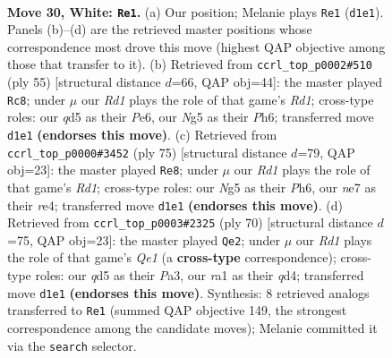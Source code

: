 \documentclass[11pt]{article}
\begin{document}
\clearpage

\begin{figure}[p]\centering
\begin{subfigure}{0.46\textwidth}\centering
\resizebox{\linewidth}{!}{%
\newchessgame
\chessboard[
  setfen={1Q6/4n1k1/6p1/3q1pNp/3p3P/3P2P1/5P2/rN1R2K1 w - - 0 30},
  showmover=false,
  pgfstyle=straightmove, color=movearrow, markmove={d1-e1}
]}
\caption{}
\end{subfigure}\hfill
\begin{subfigure}{0.46\textwidth}\centering
\resizebox{\linewidth}{!}{%
\newchessgame
\chessboard[
  setfen={3r2k1/1q3pp1/4p2p/1p1n4/p2R4/P5P1/1P2PP1P/2QN2K1 b - - 4 28},
  showmover=false,
  pgfstyle=straightmove, color=movearrow, markmove={d8-c8}
]}
\caption{}
\end{subfigure}
\\[4pt]
\begin{subfigure}{0.46\textwidth}\centering
\resizebox{\linewidth}{!}{%
\newchessgame
\chessboard[
  setfen={3r2k1/1p1q2p1/2p4p/1p1n4/4R3/PQ3NP1/1P3P1P/6K1 b - - 2 38},
  showmover=false,
  pgfstyle=straightmove, color=movearrow, markmove={d8-e8}
]}
\caption{}
\end{subfigure}\hfill
\begin{subfigure}{0.46\textwidth}\centering
\resizebox{\linewidth}{!}{%
\newchessgame
\chessboard[
  setfen={8/p4pk1/1n4p1/7p/2pq4/P1N3P1/1PP4P/1K2Q3 w - - 0 36},
  showmover=false,
  pgfstyle=straightmove, color=movearrow, markmove={e1-e2}
]}
\caption{}
\end{subfigure}
\caption{\textbf{Move 30, White: \texttt{Re1}.} (a) Our position; Melanie plays \texttt{Re1} (\texttt{d1e1}). Panels (b)--(d) are the retrieved master positions whose correspondence most drove this move (highest QAP objective among those that transfer to it). (b) Retrieved from \texttt{ccrl\_top\_p0002\#510} (ply 55) [structural distance $d$=66, QAP obj=44]: the master played \texttt{Rc8}; under $\mu$ our \emph{Rd1} plays the role of that game's \emph{Rd1}; cross-type roles: our \emph{q}d5 as their \emph{P}e6, our \emph{N}g5 as their \emph{P}h6; transferred move \texttt{d1e1} \textbf{(endorses this move)}. (c) Retrieved from \texttt{ccrl\_top\_p0000\#3452} (ply 75) [structural distance $d$=79, QAP obj=23]: the master played \texttt{Re8}; under $\mu$ our \emph{Rd1} plays the role of that game's \emph{Rd1}; cross-type roles: our \emph{N}g5 as their \emph{P}h6, our \emph{n}e7 as their \emph{r}e4; transferred move \texttt{d1e1} \textbf{(endorses this move)}. (d) Retrieved from \texttt{ccrl\_top\_p0003\#2325} (ply 70) [structural distance $d$=75, QAP obj=23]: the master played \texttt{Qe2}; under $\mu$ our \emph{Rd1} plays the role of that game's \emph{Qe1} (a \textbf{cross-type} correspondence); cross-type roles: our \emph{q}d5 as their \emph{P}a3, our \emph{r}a1 as their \emph{q}d4; transferred move \texttt{d1e1} \textbf{(endorses this move)}. Synthesis: 8 retrieved analogs transferred to \texttt{Re1} (summed QAP objective 149, the strongest correspondence among the candidate moves); Melanie committed it via the \texttt{search} selector.}
\label{fig:thought-m58}
\end{figure}
\end{document}
